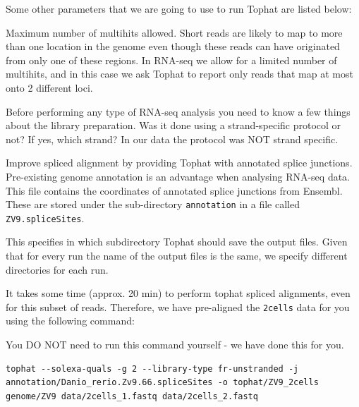 \begin{note}
Some other parameters that we are going to use to run Tophat are listed below:
\begin{description}[style=multiline,labelindent=0cm,align=right,leftmargin=\descriptionlabelspace,rightmargin=1.5cm,font=\ttfamily]
 \item[-g] Maximum number of multihits allowed. Short reads are likely to map to
 more than one location in the genome even though these reads can have originated
 from only one of these regions. In RNA-seq we allow for a limited number of
 multihits, and in this case we ask Tophat to report only reads that map at most
 onto 2 different loci.
 \item[--library-type] Before performing any type of RNA-seq analysis you need
 to know a few things about the library preparation. Was it done using a
 strand-specific protocol or not? If yes, which strand? In our data the protocol
 was NOT strand specific.
 \item[-j] Improve spliced alignment by providing Tophat with annotated splice
 junctions. Pre-existing genome annotation is an advantage when analysing RNA-seq
 data. This file contains the coordinates of annotated splice junctions from Ensembl.
 These are stored under the sub-directory \texttt{annotation} in a file called
 \texttt{ZV9.spliceSites}.
 \item[-o] This specifies in which subdirectory Tophat should save the output
 files. Given that for every run the name of the output files is the same, we
 specify different directories for each run.
\end{description}
\end{note}

It takes some time (approx. 20 min) to perform tophat spliced alignments, even for this subset of
reads. Therefore, we have pre-aligned the \texttt{2cells} data for you using the following command:
\begin{warning}
You DO NOT need to run this command yourself - we have done this for you.

\begin{lstlisting}
tophat --solexa-quals -g 2 --library-type fr-unstranded -j annotation/Danio_rerio.Zv9.66.spliceSites -o tophat/ZV9_2cells genome/ZV9 data/2cells_1.fastq data/2cells_2.fastq
\end{lstlisting}
\end{warning}

